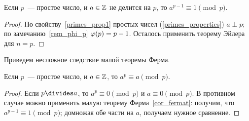 \begin{corollary}\label{cor_fermat}
Если $p$~--- простое число, и $a\in\mathbb Z$ не делится на $p$,
то $a^{p-1}\equiv 1\pmod{p}$.
\end{corollary}
\begin{proof}
По свойству~\ref{primes_prop1} простых чисел (\ref{primes_properties})
$a\perp p$; по замечанию~\ref{rem_phi_p} $\varphi(p)=p-1$. Осталось
применить теорему Эйлера для $n=p$.
\end{proof}

Приведем несложное следствие малой теоремы Ферма.

\begin{corollary}\label{cor_fermat2}
Если $p$~--- простое число, и $a\in\mathbb Z$, то
$a^p\equiv a\pmod{p}$.
\end{corollary}
\begin{proof}
Если $p\divides a$, то $a^p\equiv 0\pmod{p}$ и $a\equiv
0\pmod{p}$. В противном случае можно применить малую теорему
Ферма~\ref{cor_fermat}: получим, что $a^{p-1}\equiv 1\pmod{p}$;
домножая обе части на $a$, получаем нужное сравнение.
\end{proof}

